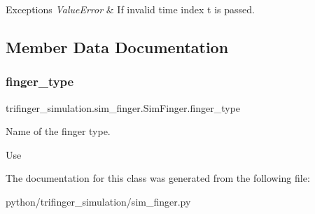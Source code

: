 \begin{DoxyExceptions}{Exceptions}
{\em Value\+Error} & If invalid time index {\ttfamily t} is passed. \\
\hline
\end{DoxyExceptions}


\subsection{Member Data Documentation}
\mbox{\label{classtrifinger__simulation_1_1sim__finger_1_1SimFinger_a34b39b76cad22883bee483aed5d79b09}} 
\subsubsection{\texorpdfstring{finger\+\_\+type}{finger\_type}}
{\footnotesize\ttfamily trifinger\+\_\+simulation.\+sim\+\_\+finger.\+Sim\+Finger.\+finger\+\_\+type}



Name of the finger type. 

Use 

The documentation for this class was generated from the following file\+:\begin{DoxyCompactItemize}
\item 
python/trifinger\+\_\+simulation/sim\+\_\+finger.\+py\end{DoxyCompactItemize}

